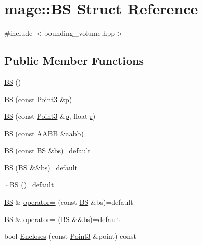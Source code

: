 \hypertarget{structmage_1_1_b_s}{}\section{mage\+:\+:BS Struct Reference}
\label{structmage_1_1_b_s}


{\ttfamily \#include $<$bounding\+\_\+volume.\+hpp$>$}

\subsection*{Public Member Functions}
\begin{DoxyCompactItemize}
\item 
\hyperlink{structmage_1_1_b_s_aa34921d9ea23b9a724ddf739b3adabfa}{BS} ()
\item 
\hyperlink{structmage_1_1_b_s_ae64c575576180fb6409125c8792c2d29}{BS} (const \hyperlink{structmage_1_1_point3}{Point3} \&\hyperlink{structmage_1_1_b_s_a9c6ad8f37fa6b98179e8108c8584fdcf}{p})
\item 
\hyperlink{structmage_1_1_b_s_a23be36778ebc6b31fcfb31fb032fdb0e}{BS} (const \hyperlink{structmage_1_1_point3}{Point3} \&\hyperlink{structmage_1_1_b_s_a9c6ad8f37fa6b98179e8108c8584fdcf}{p}, float \hyperlink{structmage_1_1_b_s_ab2e786e8493feb28a3bc0216e8dea5bc}{r})
\item 
\hyperlink{structmage_1_1_b_s_adb709aad7bd4b6816ae59ec87221bd6a}{BS} (const \hyperlink{structmage_1_1_a_a_b_b}{A\+A\+BB} \&aabb)
\item 
\hyperlink{structmage_1_1_b_s_a01cf5aaeae2a87c56527a338889f5079}{BS} (const \hyperlink{structmage_1_1_b_s}{BS} \&bs)=default
\item 
\hyperlink{structmage_1_1_b_s_a8974a41ba4a204e1b7ad5a218f9629e8}{BS} (\hyperlink{structmage_1_1_b_s}{BS} \&\&bs)=default
\item 
\hyperlink{structmage_1_1_b_s_a111f60f8ab53c7497ff7aaa743619829}{$\sim$\+BS} ()=default
\item 
\hyperlink{structmage_1_1_b_s}{BS} \& \hyperlink{structmage_1_1_b_s_aef60d898cb44bbf1e3988351b5717faa}{operator=} (const \hyperlink{structmage_1_1_b_s}{BS} \&bs)=default
\item 
\hyperlink{structmage_1_1_b_s}{BS} \& \hyperlink{structmage_1_1_b_s_a751360f4d52fe40f6f07f29a759c9f0c}{operator=} (\hyperlink{structmage_1_1_b_s}{BS} \&\&bs)=default
\item 
bool \hyperlink{structmage_1_1_b_s_a1298419385ad961cd68deb2ec049879d}{Encloses} (const \hyperlink{structmage_1_1_point3}{Point3} \&point) const

\end{DoxyCompactItemize}
